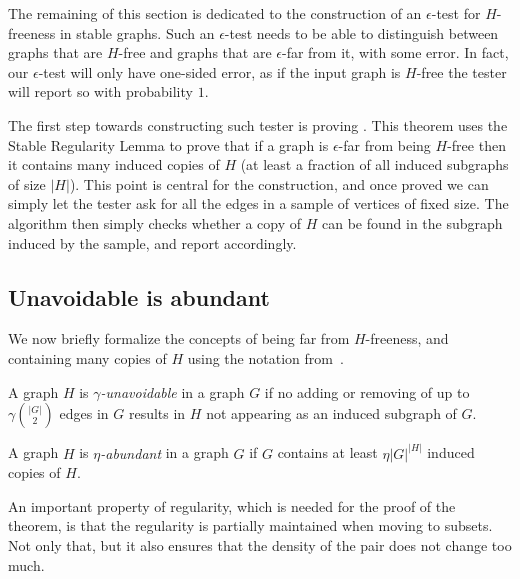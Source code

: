     The remaining of this section is dedicated to the construction of an $\epsilon$-test for $H$-freeness in stable graphs.
    Such an $\epsilon$-test needs to be able to distinguish between graphs that are $H$-free and graphs that
    are $\epsilon$-far from it, with some error.
    In fact, our $\epsilon$-test will only have one-sided error, as if the input graph is $H$-free the tester will report so
    with probability $1$.

    The first step towards constructing such tester is proving .
    This theorem uses the Stable Regularity Lemma to prove that if a graph is $\epsilon$-far
    from being $H$-free then it contains many induced copies of $H$ (at least a fraction of all induced subgraphs of size $|H|$).
    This point is central for the construction, and once proved we can simply let the tester ask for all the edges
    in a sample of vertices of fixed size.
    The algorithm then simply checks whether a copy of $H$ can be found in the subgraph induced by the sample, and report
    accordingly.

    \subsection{Unavoidable is abundant} \label{subsec:subsection_6.1}

        We now briefly formalize the concepts of being far from $H$-freeness, and containing many copies of $H$ using the
        notation from~\cite{efficient_testing_of_large_graphs}.

        \begin{definition} \label{def:unavoidable}
            A graph $H$ is \emph{$\gamma$-unavoidable} in a graph $G$ if no adding or removing of up to $\gamma {|G| \choose 2}$
            edges in $G$ results in $H$ not appearing as an induced subgraph of $G$.
        \end{definition}

        \begin{definition} \label{def:abundant}
            A graph $H$ is \emph{$\eta$-abundant} in a graph $G$ if $G$ contains at least $\eta |G|^{|H|}$
            induced copies of $H$.
        \end{definition}

        An important property of regularity, which is needed for the proof of the theorem, is that the regularity is
        partially maintained when moving to subsets.
        Not only that, but it also ensures that the density of the pair does not change too much.

